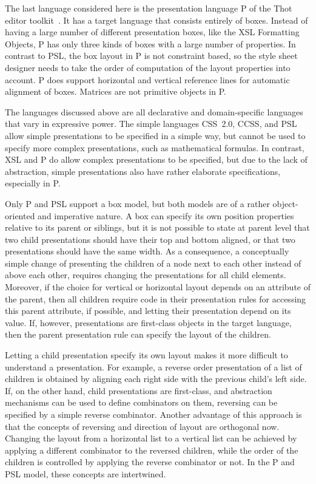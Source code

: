  The last language considered here is the presentation language P of the Thot editor toolkit~\cite{thot}. It has a target language that consists entirely of boxes. Instead of having a large number of different presentation boxes, like the XSL Formatting Objects, P has only three kinds of boxes with a large number of properties. In contrast to PSL, the box layout in P is not constraint based, so the style sheet designer needs to take the order of computation of the layout properties into account. P does support horizontal and vertical reference lines for automatic alignment of boxes. Matrices are not primitive objects in P.

 The languages discussed above are all declarative and domain-specific languages that vary in expressive power. The simple languages CSS~2.0, CCSS, and PSL allow simple presentations to be specified in a simple way, but cannot be used to specify more complex presentations, such as mathematical formulas. In contrast, XSL and P do allow complex presentations to be specified, but due to the lack of abstraction, simple presentations also have rather elaborate specifications, especially in P. 

Only P and PSL support a box model, but both models are of a rather object-oriented and imperative nature. A box can specify its own position properties relative to its parent or siblings, but it is not possible to state at parent level that two child presentations should have their top and bottom aligned, or that two presentations should have the same width. As a consequence, a conceptually simple change of presenting the children of a node next to each other instead of above each other, requires changing the presentations for all child elements. Moreover, if the choice for vertical or horizontal layout depends on an attribute of the parent, then all children require code in their presentation rules for accessing this parent attribute, if possible, and letting their presentation depend on its value. If, however, presentations are first-class objects in the target language, then the parent presentation rule can specify the layout of the children.

Letting a child presentation specify its own layout makes it more difficult to understand a presentation. For example, a reverse order presentation of a list of children is obtained by aligning each right side with the previous child's left side. If, on the other hand, child presentations are first-class, and abstraction mechanisms can be used to define combinators on them, reversing can be specified by a simple reverse combinator. Another advantage of this approach is that the concepts of reversing and direction of layout are orthogonal now. Changing the layout from a horizontal list to a vertical list can be achieved by applying a different combinator to the reversed children, while the order of the children is controlled by applying the reverse combinator or not. In the P and PSL model, these concepts are intertwined.

